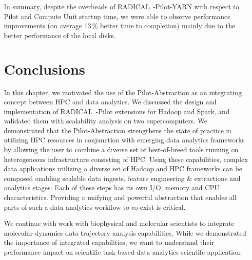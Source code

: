 In summary, despite the overheads of RADICAL~-Pilot-YARN with respect to Pilot and Compute Unit startup time, we were able to observe performance improvements (on average 13\,\% better time to completion) mainly due to the better performance of the local disks.


\section{Conclusions}
\label{sec:hpc_hadoop_concl}
In this chapter, we motivated the use of the Pilot-Abstraction as an integrating concept between HPC and data analytics.
We discussed the design and implementation of RADICAL~-Pilot extensions for Hadoop and Spark, and validated them with scalability analysis on two supercomputers.
We demonstrated that the Pilot-Abstraction strengthens the state of practice in utilizing HPC resources in conjunction with emerging data analytics frameworks by allowing the user to combine a diverse set of best-of-breed tools running on heterogeneous infrastructure consisting of HPC.
Using these capabilities, complex data applications utilizing a diverse set of Hadoop and HPC frameworks can be composed enabling scalable data ingests, feature engineering \& extractions and analytics stages.
Each of these steps has its own I/O, memory and CPU characteristics. 
Providing a unifying and powerful abstraction that enables all parts of such a data analytics workflow to co-exist is critical.

We continue with work with biophysical and molecular scientists to integrate molecular dynamics data trajectory analysis capabilities.
While we demonstrated the importance of integrated capabilities, we want to understand their performance impact on scientific task-based data analytics scientifc application.
